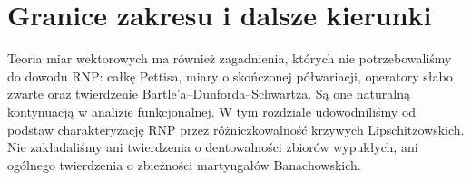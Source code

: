 \section{Granice zakresu i dalsze kierunki}
Teoria miar wektorowych ma również zagadnienia,
których nie potrzebowaliśmy do dowodu RNP:
całkę Pettisa, miary o skończonej półwariacji,
operatory słabo zwarte oraz twierdzenie
Bartle'a--Dunforda--Schwartza.
Są one naturalną kontynuacją w analizie funkcjonalnej.
W tym rozdziale udowodniliśmy od podstaw
charakteryzację RNP przez różniczkowalność krzywych
Lipschitzowskich. Nie zakładaliśmy ani twierdzenia
o dentowalności zbiorów wypukłych, ani ogólnego
twierdzenia o zbieżności martyngałów Banachowskich.
